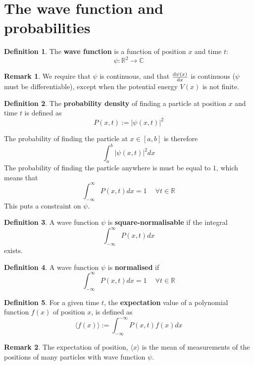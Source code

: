 \documentclass[12pt,a4paper]{article}
\theoremstyle{definition}
\newtheorem{definition}{Definition}[subsection]
\newtheorem*{remark}{Remark}
\let\oldforall\forall
\renewcommand{\forall}{\ \oldforall}
\begin{document}
\section{The wave function and probabilities}

\begin{definition}
	The \textbf{wave function} is a function of position $x$ and time $t$:
	\[
		\psi: \mathbb{R}^2 \rightarrow \mathbb{C}
	\]
\end{definition}

\begin{remark}
	We require that $\psi$ is continuous, and that $\diff{\psi(x)}{x}$ is continuous ($\psi$ must be differentiable), except when the potential energy $V(x)$ is not finite. 
\end{remark}

\begin{definition}
	The \textbf{probability density} of finding a particle at position $x$ and time $t$ is defined as
	\[
		P(x, t) := |\psi(x, t)|^2
	\]

	The probability of finding the particle at $x \in [a, b]$ is therefore
	\[
		\int_a^b |\psi(x, t)|^2 dx
	\]
	The probability of finding the particle anywhere is must be equal to $1$, which means that
	\[
		\int_{-\infty}^{\infty} P(x, t) dx = 1 \quad \forall t \in \mathbb{R}
	\]
	This puts a constraint on $\psi$.
\end{definition}

\begin{definition}
	A wave function $\psi$ is \textbf{square-normalisable} if the integral
	\[
		\int_{-\infty}^{\infty} P(x, t) dx
	\]
	exists.
\end{definition}

\begin{definition}
	A wave function $\psi$ is \textbf{normalised} if
	\[
		\int_{-\infty}^{\infty} P(x, t) dx = 1 \quad \forall t \in \mathbb{R}	
	\]
\end{definition}

\begin{definition}
	For a given time $t$, the \textbf{expectation} value of a polynomial function $f(x)$ of position $x$, is defined as
	\[
		\langle f(x) \rangle := \int_{-\infty}^{-\infty} P(x, t) f(x) dx
	\]
\end{definition}

\begin{remark}
	The expectation of position, $\langle x \rangle$ is the mean of measurements of the positions of many particles with wave function $\psi$.
\end{remark}
\end{document}
